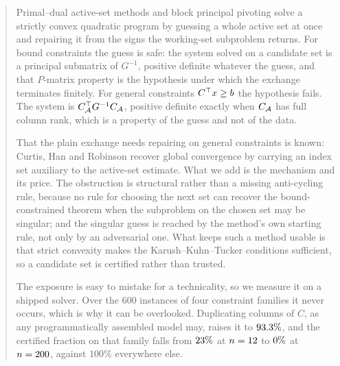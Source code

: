 \begin{abstract}
\noindent
Primal--dual active-set methods and block principal pivoting solve a strictly
convex quadratic program by guessing a whole active set at once and repairing it
from the signs the working-set subproblem returns. For bound constraints the
guess is safe: the system solved on a candidate set is a principal submatrix of
$G^{-1}$, positive definite whatever the guess, and that $P$-matrix property is
the hypothesis under which the exchange terminates finitely. For general
constraints $C\T x \ge b$ the hypothesis fails. The system is
$C_\Active\T G^{-1} C_\Active$, positive definite exactly when $C_\Active$ has
full column rank, which is a property of the guess and not of the data.

That the plain exchange needs repairing on general constraints is known: Curtis,
Han and Robinson recover global convergence by carrying an index set auxiliary to
the active-set estimate. What we add is the mechanism and its price. The
obstruction is structural rather than a missing anti-cycling rule, because no rule
for choosing the next set can recover the bound-constrained theorem when the
subproblem on the chosen set may be singular; and the singular guess is reached by
the method's own starting rule, not only by an adversarial one. What keeps such a
method usable is that strict convexity makes the Karush--Kuhn--Tucker conditions
sufficient, so a candidate set is certified rather than trusted.

The exposure is easy to mistake for a technicality, so we measure it on a shipped
solver. Over the $600$ instances of four constraint families it never
occurs, which is why it can be overlooked. Duplicating columns of $C$, as any
programmatically assembled model may, raises it to $\qpPdasSingularDup\%$, and the
certified fraction on that family falls from $\qpPdasCertSmall\%$ at
$n = \qpPdasNsmall{}$ to $\qpPdasCertBig\%$ at $n = \qpPdasNbig{}$, against
$100\%$ everywhere else.
\end{abstract}
